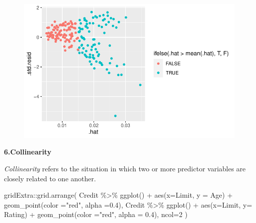 \documentclass[
  letterpaper,
  DIV=11,
  numbers=noendperiod]{scrreprt}
\newenvironment{Shaded}{\begin{snugshade}}{\end{snugshade}}
\newcommand{\AttributeTok}[1]{\textcolor[rgb]{0.65,0.35,0.00}{#1}}
\newcommand{\DecValTok}[1]{\textcolor[rgb]{0.47,0.16,0.63}{#1}}
\newcommand{\FloatTok}[1]{\textcolor[rgb]{0.65,0.35,0.00}{#1}}
\newcommand{\FunctionTok}[1]{\textcolor[rgb]{0.02,0.16,0.49}{#1}}
\newcommand{\NormalTok}[1]{\textcolor[rgb]{0.33,0.33,0.33}{#1}}
\newcommand{\SpecialCharTok}[1]{\textcolor[rgb]{0.00,0.46,0.62}{#1}}
\newcommand{\StringTok}[1]{\textcolor[rgb]{0.00,0.50,0.00}{#1}}
\begin{document}
\begin{figure}[H]

{\centering \includegraphics{Chapter3_files/figure-pdf/unnamed-chunk-101-1.pdf}

}

\end{figure}

\textbf{6.Collinearity}

\emph{Collinearity} refers to the situation in which two or more
predictor variables are closely related to one another.

\begin{Shaded}
\begin{Highlighting}[]
\NormalTok{gridExtra}\SpecialCharTok{::}\FunctionTok{grid.arrange}\NormalTok{(}
\NormalTok{  Credit }\SpecialCharTok{\%\textgreater{}\%} \FunctionTok{ggplot}\NormalTok{() }\SpecialCharTok{+} \FunctionTok{aes}\NormalTok{(}\AttributeTok{x=}\NormalTok{Limit, }\AttributeTok{y =}\NormalTok{ Age) }\SpecialCharTok{+} \FunctionTok{geom\_point}\NormalTok{(}\AttributeTok{color =}\StringTok{"red"}\NormalTok{, }\AttributeTok{alpha =}\FloatTok{0.4}\NormalTok{),}
\NormalTok{  Credit }\SpecialCharTok{\%\textgreater{}\%} \FunctionTok{ggplot}\NormalTok{() }\SpecialCharTok{+} \FunctionTok{aes}\NormalTok{(}\AttributeTok{x=}\NormalTok{Limit, }\AttributeTok{y=}\NormalTok{ Rating) }\SpecialCharTok{+} \FunctionTok{geom\_point}\NormalTok{(}\AttributeTok{color =}\StringTok{"red"}\NormalTok{, }\AttributeTok{alpha =} \FloatTok{0.4}\NormalTok{),}
  \AttributeTok{ncol=}\DecValTok{2}
\NormalTok{)}
\end{Highlighting}
\end{Shaded}
\end{document}
